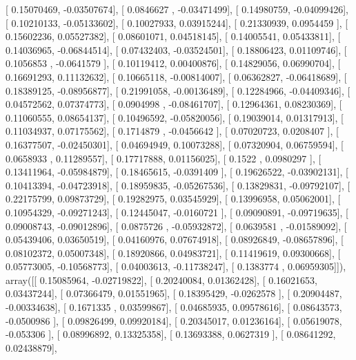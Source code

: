 \documentclass{article}
\begin{document}
       [ 0.15070469, -0.03507674],
       [ 0.0846627 , -0.03471499],
       [ 0.14980759, -0.04099426],
       [ 0.10210133, -0.05133602],
       [ 0.10027933,  0.03915244],
       [ 0.21330939,  0.0954459 ],
       [ 0.15602236,  0.05527382],
       [ 0.08601071,  0.04518145],
       [ 0.14005541,  0.05433811],
       [ 0.14036965, -0.06844514],
       [ 0.07432403, -0.03524501],
       [ 0.18806423,  0.01109746],
       [ 0.1056853 , -0.0641579 ],
       [ 0.10119412,  0.00400876],
       [ 0.14829056,  0.06990704],
       [ 0.16691293,  0.11132632],
       [ 0.10665118, -0.00814007],
       [ 0.06362827, -0.06418689],
       [ 0.18389125, -0.08956877],
       [ 0.21991058, -0.00136489],
       [ 0.12284966, -0.04409346],
       [ 0.04572562,  0.07374773],
       [ 0.0904998 , -0.08461707],
       [ 0.12964361,  0.08230369],
       [ 0.11060555,  0.08654137],
       [ 0.10496592, -0.05820056],
       [ 0.19039014,  0.01317913],
       [ 0.11034937,  0.07175562],
       [ 0.1714879 , -0.0456642 ],
       [ 0.07020723,  0.0208407 ],
       [ 0.16377507, -0.02450301],
       [ 0.04694949,  0.10073288],
       [ 0.07320904,  0.06759594],
       [ 0.0658933 ,  0.11289557],
       [ 0.17717888,  0.01156025],
       [ 0.1522    ,  0.0980297 ],
       [ 0.13411964, -0.05984879],
       [ 0.18465615, -0.0391409 ],
       [ 0.19626522, -0.03902131],
       [ 0.10413394, -0.04723918],
       [ 0.18959835, -0.05267536],
       [ 0.13829831, -0.09792107],
       [ 0.22175799,  0.09873729],
       [ 0.19282975,  0.03545929],
       [ 0.13996958,  0.05062001],
       [ 0.10954329, -0.09271243],
       [ 0.12445047, -0.0160721 ],
       [ 0.09090891, -0.09719635],
       [ 0.09008743, -0.09012896],
       [ 0.0875726 , -0.05932872],
       [ 0.0639581 , -0.01589092],
       [ 0.05439406,  0.03650519],
       [ 0.04160976,  0.07674918],
       [ 0.08926849, -0.08657896],
       [ 0.08102372,  0.05007348],
       [ 0.18920866,  0.04983721],
       [ 0.11419619,  0.09300668],
       [ 0.05773005, -0.10568773],
       [ 0.04003613, -0.11738247],
       [ 0.1383774 ,  0.06959305]]), array([[ 0.15085964, -0.02719822],
       [ 0.20240084,  0.01362428],
       [ 0.16021653,  0.03437244],
       [ 0.07366479,  0.01551965],
       [ 0.18395429, -0.0262578 ],
       [ 0.20904487, -0.00334638],
       [ 0.1671335 ,  0.03599867],
       [ 0.04685935,  0.09578616],
       [ 0.08643573, -0.0500986 ],
       [ 0.09826499,  0.09920184],
       [ 0.20345017,  0.01236164],
       [ 0.05619078, -0.053306  ],
       [ 0.08996892,  0.13325358],
       [ 0.13693388,  0.0627319 ],
       [ 0.08641292,  0.02438879],
\end{document}
